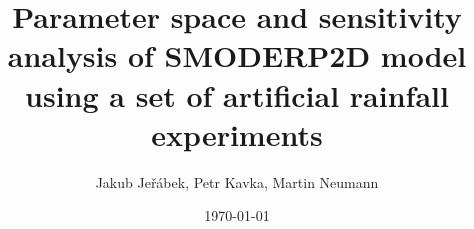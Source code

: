 \documentclass[10pt, aspectratio=169]{beamer}
\title{
Parameter space and sensitivity analysis of SMODERP2D model using a set of artificial rainfall experiments}
\author{Jakub Jeřábek, Petr Kavka, Martin Neumann}
\institute{CTU in Prague}
\date{\today}
\begin{document}
  
    \begin{frame}
      \titlepage
    \end{frame}

    
    
    

    
\end{document}
